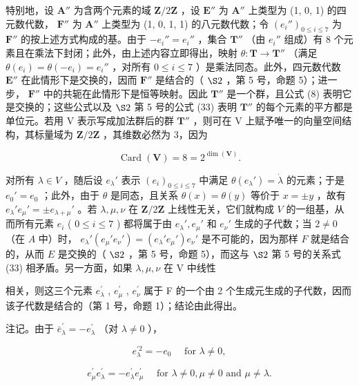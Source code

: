 特别地，设 \(\mathbf{A}''\) 为含两个元素的域 \(\mathbf{Z}/2\mathbf{Z}\) ，设 \(\mathbf{E}''\) 为 \(\mathbf{A}''\) 上类型为 (1, 0, 1) 的四元数代数， \(\mathbf{F}''\) 为 \(\mathbf{A}''\) 上类型为 (1, 0, 1, 1) 的八元数代数；令 \((e_i'')_{0 \leq i \leq 7}\) 为 \(\mathbf{F}''\) 的按上述方式构成的基。由于 \(-e_i'' = e_i''\) ，集合 \(\mathbf{T}''\) （由 \(e_i''\) 组成）有 8 个元素且在乘法下封闭；此外，由上述内容立即得出，映射 \(\theta: \mathbf{T} \to \mathbf{T}''\) （满足 \(\theta(e_i) = \theta(-e_i) = e_i''\) ，对所有 \(0 \leq i \leq 7\) ）是乘法同态。此外，四元数代数 \(\mathbf{E}''\) 在此情形下是交换的，因而 \(\mathbf{F}''\) 是结合的（ \(\S 2\) ，第 5 号，命题 5）；进一步， \(\mathbf{F}''\) 中的共轭在此情形下是恒等映射。因此 \(\mathbf{T}''\) 是一个群，且公式 (8) 表明它是交换的；这些公式以及 \(\S 2\) 第 5 号的公式 (33) 表明 \(\mathbf{T}''\) 的每个元素的平方都是单位元。若用 V 表示写成加法群后的群 \(\mathbf{T}''\) ，则可在 V 上赋予唯一的向量空间结构，其标量域为 \(\mathbf{Z}/2\mathbf{Z}\) ，其维数必然为 3，因为

\[
\operatorname{Card} (\mathbf {V}) = 8 = 2 ^ {\dim (\mathbf {V})}.
\]

对所有 \(\lambda \in V\) ，随后设 \(e_{\lambda}'\) 表示 \((e_i)_{0 \leq i \leq 7}\) 中满足 \(\theta(e_{\lambda}') = \dot{\lambda}\) 的元素；于是 \(e_0' = e_0\) ；此外，由于 \(\theta\) 是同态，且关系 \(\theta(x) = \theta(y)\) 等价于 \(x = \pm y\) ，故有 \(e_{\lambda}' e_{\mu}' = \pm e_{\lambda + \mu}'\) 。若 \(\lambda, \mu, \nu\) 在 \(\mathbf{Z}/2\mathbf{Z}\) 上线性无关，它们就构成 \(V\) 的一组基，从而所有元素 \(e_i\) ( \(0 \leqslant i \leqslant 7\) ) 都将属于由 \(e_{\lambda}', e_{\mu}'\) 和 \(e_{\nu}'\) 生成的子代数；当 \(2 \neq 0\) （在 \(A\) 中）时， \(e_{\lambda}'(e_{\mu}' e_{\nu}') = (e_{\lambda}' e_{\mu}') e_{\nu}'\) 是不可能的，因为那样 \(F\) 就是结合的，从而 \(E\) 是交换的（ \(\S 2\) ，第 5 号，命题 5），而这与 \(\S 2\) 第 5 号的关系式 (33) 相矛盾。另一方面，如果 \(\lambda, \mu, \nu\) 在 V 中线性

相关，则这三个元素 \(e_{\lambda}^{\prime}\) , \(e_{\mu}^{\prime}\) , \(e_{\nu}^{\prime}\) 属于 F 的一个由 2 个生成元生成的子代数，因而该子代数是结合的（第 1 号，命题 1）；结论由此得出。

注记。由于 \(\bar{e}_{\lambda}^{\prime} = -e_{\lambda}^{\prime}\) （对 \(\lambda \neq 0\) ），

\[
e _ {\lambda} ^ {\prime 2} = - e _ {0} \quad \text { for } \lambda \neq 0,
\]

\[
e _ {\mu} ^ {\prime} e _ {\lambda} ^ {\prime} = - e _ {\lambda} ^ {\prime} e _ {\mu} ^ {\prime} \quad \text { for } \lambda \neq 0, \mu \neq 0 \text { and } \mu \neq \lambda .
\]

